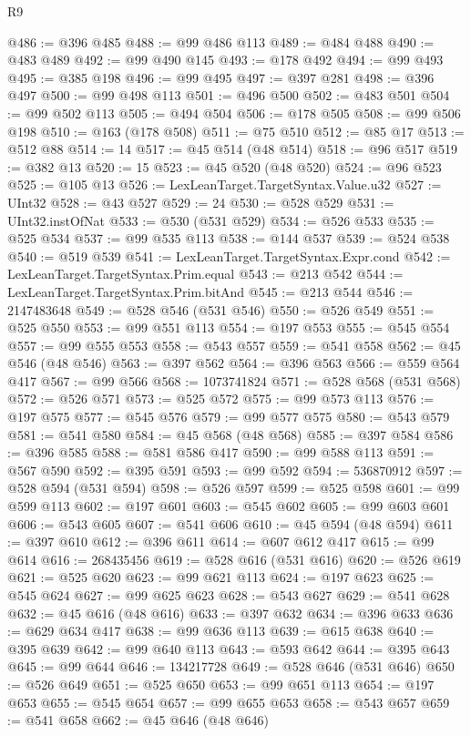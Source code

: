 \begin{lexlean}{R9}
\begin{coremodule}
{{{{{{{{{{{{{{{{{{{{{{{{{{{{{{{{{{{{{{{{{{{{{{{{{{{{{{{{{{{{{{{{{{{{{{{{{{{{{{{{{{{{@486 := @396 @485
@488 := @99 @486 @113
@489 := @484 @488
@490 := @483 @489
@492 := @99 @490 @145
@493 := @178 @492
@494 := @99 @493
@495 := @385 @198
@496 := @99 @495
@497 := @397 @281
@498 := @396 @497
@500 := @99 @498 @113
@501 := @496 @500
@502 := @483 @501
@504 := @99 @502 @113
@505 := @494 @504
@506 := @178 @505
@508 := @99 @506 @198
@510 := @163 (@178 @508)
@511 := @75 @510
@512 := @85 @17
@513 := @512 @88
@514 := 14
@517 := @45 @514 (@48 @514)
@518 := @96 @517
@519 := @382 @13
@520 := 15
@523 := @45 @520 (@48 @520)
@524 := @96 @523
@525 := @105 @13
@526 := LexLeanTarget.TargetSyntax.Value.u32
@527 := UInt32
@528 := @43 @527
@529 := 24
@530 := @528 @529
@531 := UInt32.instOfNat
@533 := @530 (@531 @529)
@534 := @526 @533
@535 := @525 @534
@537 := @99 @535 @113
@538 := @144 @537
@539 := @524 @538
@540 := @519 @539
@541 := LexLeanTarget.TargetSyntax.Expr.cond
@542 := LexLeanTarget.TargetSyntax.Prim.equal
@543 := @213 @542
@544 := LexLeanTarget.TargetSyntax.Prim.bitAnd
@545 := @213 @544
@546 := 2147483648
@549 := @528 @546 (@531 @546)
@550 := @526 @549
@551 := @525 @550
@553 := @99 @551 @113
@554 := @197 @553
@555 := @545 @554
@557 := @99 @555 @553
@558 := @543 @557
@559 := @541 @558
@562 := @45 @546 (@48 @546)
@563 := @397 @562
@564 := @396 @563
@566 := @559 @564 @417
@567 := @99 @566
@568 := 1073741824
@571 := @528 @568 (@531 @568)
@572 := @526 @571
@573 := @525 @572
@575 := @99 @573 @113
@576 := @197 @575
@577 := @545 @576
@579 := @99 @577 @575
@580 := @543 @579
@581 := @541 @580
@584 := @45 @568 (@48 @568)
@585 := @397 @584
@586 := @396 @585
@588 := @581 @586 @417
@590 := @99 @588 @113
@591 := @567 @590
@592 := @395 @591
@593 := @99 @592
@594 := 536870912
@597 := @528 @594 (@531 @594)
@598 := @526 @597
@599 := @525 @598
@601 := @99 @599 @113
@602 := @197 @601
@603 := @545 @602
@605 := @99 @603 @601
@606 := @543 @605
@607 := @541 @606
@610 := @45 @594 (@48 @594)
@611 := @397 @610
@612 := @396 @611
@614 := @607 @612 @417
@615 := @99 @614
@616 := 268435456
@619 := @528 @616 (@531 @616)
@620 := @526 @619
@621 := @525 @620
@623 := @99 @621 @113
@624 := @197 @623
@625 := @545 @624
@627 := @99 @625 @623
@628 := @543 @627
@629 := @541 @628
@632 := @45 @616 (@48 @616)
@633 := @397 @632
@634 := @396 @633
@636 := @629 @634 @417
@638 := @99 @636 @113
@639 := @615 @638
@640 := @395 @639
@642 := @99 @640 @113
@643 := @593 @642
@644 := @395 @643
@645 := @99 @644
@646 := 134217728
@649 := @528 @646 (@531 @646)
@650 := @526 @649
@651 := @525 @650
@653 := @99 @651 @113
@654 := @197 @653
@655 := @545 @654
@657 := @99 @655 @653
@658 := @543 @657
@659 := @541 @658
@662 := @45 @646 (@48 @646)
}}}}}}}}}}}}}}}}}}}}}}}}}}}}}}}}}}}}}}}}}}}}}}}}}}}}}}}}}}}}}}}}}}}}}}}}}}}}}}}}}}}}
\end{coremodule}
\end{lexlean}
